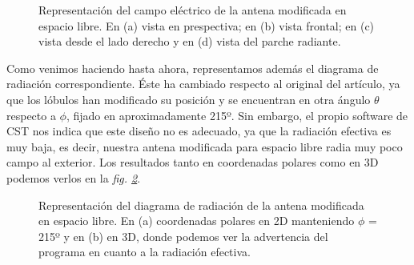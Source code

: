 \begin{figure}[!htb]
    \caption{Representación del campo eléctrico de la antena modificada en espacio libre. En (a) vista en prespectiva; en (b) vista frontal; en (c) vista desde el lado derecho y en (d) vista del parche radiante.}
    \label{fig:fig5.20}
\end{figure}

Como venimos haciendo hasta ahora, representamos además el diagrama de radiación correspondiente. Éste ha cambiado respecto al original del artículo, ya que los lóbulos han modificado su posición y se encuentran en otra ángulo $\theta$ respecto a $\phi$, fijado en aproximadamente 215º. Sin embargo, el propio software de CST nos indica que este diseño no es adecuado, ya que la radiación efectiva es muy baja, es decir, nuestra antena modificada para espacio libre radia muy poco campo al exterior. Los resultados tanto en coordenadas polares como en 3D podemos verlos en la \textit{fig. \ref{fig:fig5.21}}.

\begin{figure}[!htb]
    \centering
    \caption{Representación del diagrama de radiación de la antena modificada en espacio libre. En (a) coordenadas polares en 2D manteniendo $\phi$ = 215º y en (b) en 3D, donde podemos ver la advertencia del programa en cuanto a la radiación efectiva.}
    \label{fig:fig5.21}
\end{figure}

